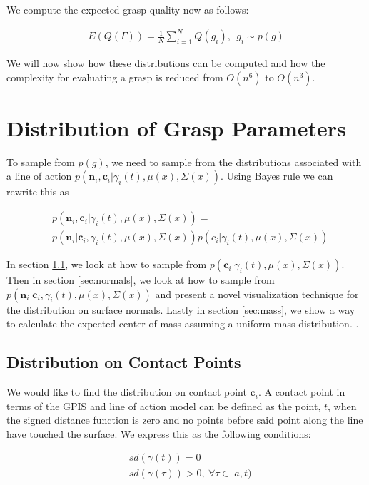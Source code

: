 \documentclass[letterpaper, 10 pt, conference]{ieeeconf}  %
\begin{document}
We compute the expected grasp quality now as follows: 

\vspace{-2ex}
\begin{align}\label{eq:grasp_sampling}
E(Q(\Gamma)) = \frac{1}{N} \sum_{i=1}^N Q(g_i) , \ \ g_i \sim p(g)
\end{align}


We will now show how these distributions can be computed and how the complexity for evaluating a grasp is reduced from $O(n^6)$ to $O(n^3)$. 


\section{Distribution of Grasp Parameters}
\label{sec:distgrasp}
 
 To sample from $p(g)$, we need to sample from the distributions associated with a line of action $p(\textbf{n}_i,\textbf{c}_i|\gamma_i(t),\mu(x),\Sigma(x))$. Using Bayes rule we can rewrite this as 
 
 \vspace{-2ex}
 \begin{align*}
 &p(\textbf{n}_i,\textbf{c}_i|\gamma_i(t),\mu(x),\Sigma(x))=\\
 &p(\textbf{n}_i|\textbf{c}_i,\gamma_i(t),\mu(x),\Sigma(x))p(c_i|\gamma_i(t),\mu(x),\Sigma(x))
 \end{align*}
 
 In section \ref{sec:contact}, we look at how to sample from $p(\textbf{c}_i|\gamma_i(t),\mu(x),\Sigma(x))$. Then in section \ref{sec:normals}, we look at how to sample from $p(\textbf{n}_i|\textbf{c}_i,\gamma_i(t),\mu(x),\Sigma(x))$ and present a novel visualization technique for the distribution on surface normals. Lastly in section \ref{sec:mass}, we show a way to calculate the expected center of mass assuming a uniform mass distribution. 
 .
\subsection{Distribution on Contact Points}\label{sec:contact} 
We would like to find the distribution on contact point $\textbf{c}_i$. A contact point in terms of the GPIS and line of action model can be defined as the point, $t$, when the signed distance function is zero and no points before said point along the line have touched the surface. We express this as the following conditions: 

\vspace{-2ex}
\begin{align}
 &sd(\gamma(t)) = 0 \label{eq:density_cond} \\
&sd(\gamma(\tau)) > 0, \: \forall \tau \in [a,t) \label{eq:cdf_cond}
\end{align}
\end{document}
